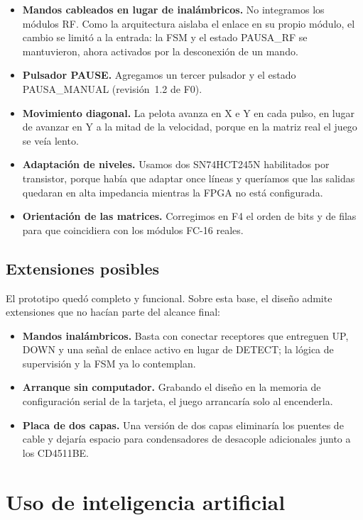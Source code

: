 \documentclass[conference,a4paper]{IEEEtran}
\begin{document}
\begin{itemize}
\item \textbf{Mandos cableados en lugar de inalámbricos.} No integramos los módulos RF. Como la arquitectura aislaba el enlace en su propio módulo, el cambio se limitó a la entrada: la FSM y el estado PAUSA\_RF se mantuvieron, ahora activados por la desconexión de un mando.
\item \textbf{Pulsador PAUSE.} Agregamos un tercer pulsador y el estado PAUSA\_MANUAL (revisión~1.2 de F0).
\item \textbf{Movimiento diagonal.} La pelota avanza en X e Y en cada pulso, en lugar de avanzar en Y a la mitad de la velocidad, porque en la matriz real el juego se veía lento.
\item \textbf{Adaptación de niveles.} Usamos dos SN74HCT245N habilitados por transistor, porque había que adaptar once líneas y queríamos que las salidas quedaran en alta impedancia mientras la FPGA no está configurada.
\item \textbf{Orientación de las matrices.} Corregimos en F4 el orden de bits y de filas para que coincidiera con los módulos FC-16 reales.
\end{itemize}

\subsection{Extensiones posibles}

El prototipo quedó completo y funcional. Sobre esta base, el diseño admite extensiones que no hacían parte del alcance final:
\begin{itemize}
\item \textbf{Mandos inalámbricos.} Basta con conectar receptores que entreguen UP, DOWN y una señal de enlace activo en lugar de DETECT; la lógica de supervisión y la FSM ya lo contemplan.
\item \textbf{Arranque sin computador.} Grabando el diseño en la memoria de configuración serial de la tarjeta, el juego arrancaría solo al encenderla.
\item \textbf{Placa de dos capas.} Una versión de dos capas eliminaría los puentes de cable y dejaría espacio para condensadores de desacople adicionales junto a los CD4511BE.
\end{itemize}

\section{Uso de inteligencia artificial}
\end{document}
